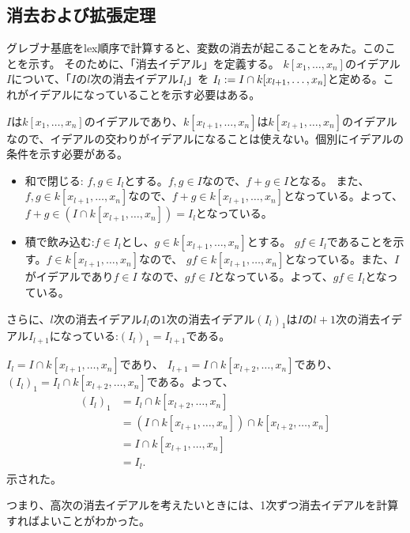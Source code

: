 \documentclass[9pt]{ltjsarticle}
\begin{document}
\subsection{消去および拡張定理}
\label{sub:消去および拡張定理}
グレブナ基底をlex順序で計算すると、変数の消去が起こることをみた。このことを示す。
そのために、「消去イデアル」を定義する。
$k[x_1,\dots,x_n]$のイデアル$I$について、「$I$の$l$次の消去イデアル$I_l$」を
$I_l := I \cap k[x_{l+1},\dots,x_n]$と定める。これがイデアルになっていることを示す必要はある。
\begin{myproof}
  $I$は$k[x_1,\dots,x_n]$のイデアルであり、$k[x_{l+1},\dots,x_n]$は$k[x_{l+1},\dots,x_n]$のイデアルなので、イデアルの交わりがイデアルになることは使えない。個別にイデアルの条件を示す必要がある。
  \begin{itemize}
    \item 和で閉じる:
    $f, g\in I_l$とする。$f,g \in I$なので、$f+g \in I$となる。
    また、$f,g \in k[x_{l+1},\dots,x_n]$なので、$f+g \in k[x_{l+1},\dots,x_n]$となっている。よって、$f+g \in (I\cap k[x_{l+1},\dots,x_n]) = I_l$となっている。
    \item 積で飲み込む:$f \in I_l$とし、$g\in k[x_{l+1},\dots,x_n]$とする。
    $gf \in I_l$であることを示す。$f\in k[x_{l+1},\dots,x_n]$なので、
    $gf \in k[x_{l+1},\dots,x_n]$となっている。また、$I$がイデアルであり$f\in I$
    なので、$gf\in I$となっている。よって、$gf\in I_l$となっている。
  \end{itemize}
\end{myproof}
さらに、$l$次の消去イデアル$I_{l}$の$1$次の消去イデアル$(I_l)_1$は$I$の$l+1$次の消去イデアル$I_{l+1}$になっている:$(I_l)_1 = I_{l+1}$である。
\begin{myproof}
  $I_l = I \cap k[x_{l+1},\dots,x_n]$であり、
  $I_{l+1} = I\cap k[x_{l+2},\dots,x_n]$であり、
  $(I_l)_1 = I_l \cap k[x_{l+2},\dots,x_n]$である。よって、
  \begin{align}
    (I_l)_1
    &=
    I_l \cap k[x_{l+2},\dots,x_n]\\
    &=
    (I\cap k[x_{l+1},\dots,x_n]) \cap k[x_{l+2},\dots,x_n]\\
    &=
    I \cap k[x_{l+1},\dots,x_n]\\
    &=
    I_l.
  \end{align}
  示された。
\end{myproof}
つまり、高次の消去イデアルを考えたいときには、1次ずつ消去イデアルを計算すればよいことがわかった。
\end{document}
